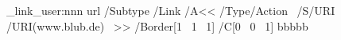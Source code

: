 \documentclass{article}
\begin{document}
\ExplSyntaxOn

 
 \pdf_link_user:nnn { url }
     {
       /Subtype /Link
       /A<<
         /Type/Action~
         /S/URI~
         /URI(www.blub.de)~
       >>
       /Border[1~ 1~ 1]
       /C[0~ 0~ 1]
     }
     {bbbbb}

\ExplSyntaxOff
\end{document}
